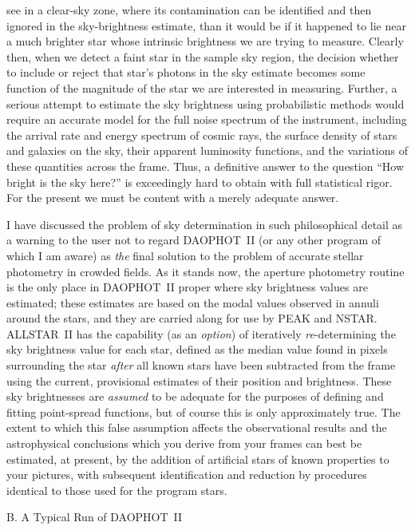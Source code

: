 see in a clear-sky zone, where its contamination can be identified and
then ignored in the sky-brightness estimate, than it would be if it
happened to lie near a much brighter star whose intrinsic brightness we
are trying to measure. Clearly then, when we detect a faint star in the
sample sky region, the decision whether to include or reject that
star's photons in the sky estimate becomes some function of the
magnitude of the star we are interested in measuring.  Further, a
serious attempt to estimate the sky brightness using probabilistic
methods would require an accurate model for the full noise spectrum of
the instrument, including the arrival rate and energy spectrum of
cosmic rays, the surface density of stars and galaxies on the sky,
their apparent luminosity functions, and the variations of these
quantities across the frame. Thus, a definitive answer to the question
``How bright is the sky here?'' is exceedingly hard to obtain with full
statistical rigor. For the present we must be content with a merely
adequate answer.

I have discussed the problem of sky determination in such philosophical
detail as a warning to the user not to regard DAOPHOT~II (or any other
program of which I am aware) as {\it the\/} final solution to the
problem of accurate stellar photometry in crowded fields.  As it stands
now, the aperture photometry routine is the only place in DAOPHOT~II
proper where sky brightness values are estimated; these estimates are
based on the modal values observed in annuli around the stars, and they
are carried along for use by PEAK and NSTAR.  ALLSTAR~II has the
capability (as an {\it option\/}) of iteratively {\it re\/}-determining
the sky brightness value for each star, defined as the median value
found in pixels surrounding the star {\it after\/} all known stars have
been subtracted from the frame using the current, provisional estimates
of their position and brightness.  These sky brightnesses are {\it
assumed\/} to be adequate for the purposes of defining and fitting
point-spread functions, but of course this is only approximately true.
The extent to which this false assumption affects the observational
results and the astrophysical conclusions which you derive from your
frames can best be estimated, at present, by the addition of artificial
stars of known properties to your pictures, with subsequent
identification and reduction by procedures identical to those used for
the program stars.

\vfill
\eject
\centerline{B.  A Typical Run of DAOPHOT~II}

